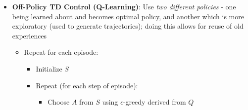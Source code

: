\documentclass[twocolumn]{article}
\providecommand{\tightlist}{%
  \setlength{\itemsep}{\GlobalItemSep}\setlength{\parskip}{\GlobalListParSkip}}
\newlength{\GlobalItemSep}
\newlength{\GlobalListParSkip}
\begin{document}
\begin{itemize}
\begin{itemize}
    \begin{itemize}
    \tightlist
    \item
      Repeat for each episode:

      \begin{itemize}
      \tightlist
      \item
        Initialize \(S\)
      \item
        Choose \(A\) from \(S\) using \(\epsilon\)-greedy policy
      \item
        Repeat (for each step of episode):

        \begin{itemize}
        \tightlist
        \item
          Take action \(A\), observe \(R\), \(S'\)
        \item
          Choose \(A'\) from \(S'\) using \(\epsilon\)-greedy
        \item
          \(Q(S, A) \leftarrow Q(S,A) + \alpha[R + \gamma Q(S', A') - Q(S, A)]\)

          \begin{itemize}
          \tightlist
          \item
            This can be generalized to n-step as well:
            \(q_t^{(n)}= R_{t+1} + \gamma R_{t+2} + ... + \gamma^{n-1}R_{t+n} + \gamma^n Q(S_{t+n}, A_{t+n})\)
          \end{itemize}
        \item
          \(S \leftarrow S'; A \leftarrow A'\)
        \end{itemize}
      \end{itemize}
    \end{itemize}
  \item
    \textbf{Off-Policy TD Control (Q-Learning)}: Use \emph{two different
    policies} - one being learned about and becomes optimal policy, and
    another which is more exploratory (used to generate trajectories);
    doing this allows for reuse of old experiences

    \begin{itemize}
    \tightlist
    \item
      Repeat for each episode:

      \begin{itemize}
      \tightlist
      \item
        Initialize \(S\)
      \item
        Repeat (for each step of episode):

        \begin{itemize}
        \tightlist
        \item
          Choose \(A\) from \(S\) using \(\epsilon\)-greedy derived from
          \(Q\)


\end{itemize}
\end{itemize}
\end{itemize}
\end{itemize}
\end{itemize}
\end{document}
